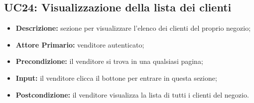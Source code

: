 \subsection{UC24: Visualizzazione della lista dei clienti}
\label{sec:UC24}
\begin{itemize}
    \item \textbf{Descrizione:} sezione per visualizzare l'elenco dei clienti del proprio negozio;
    \item \textbf{Attore Primario:} venditore autenticato; 
    \item \textbf{Precondizione:} il venditore si trova in una qualsiasi pagina;
    \item \textbf{Input:} il venditore clicca il bottone per entrare in questa sezione; 
    \item \textbf{Postcondizione:} il venditore visualizza la lista di tutti i clienti del negozio.
\end{itemize}